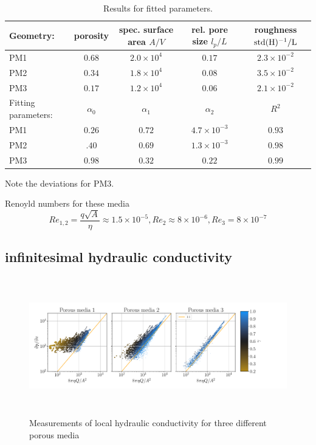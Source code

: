 \documentclass[draft]{agujournal2019}
\begin{document}
\begin{table}[htbp!]
\centering
\begin{tabular}{l|c|c|c|c}
Geometry: & porosity & spec. surface area $A/V$ &rel. pore size $ l_p/L$ & roughness $\rm{std}(H)^{-1}/L$ \\
\hline
PM1 & $0.68$ & $2.0\times10^{4}$ & $0.17$ &  $2.3\times10^{-2}$\\
PM2 & $0.34$ & $1.8\times10^{4}$ & $0.08$ &  $3.5\times10^{-2}$\\
PM3 & $0.17$ & $1.2\times10^{4}$ & $0.06$ &  $2.1\times10^{-2}$\\
\hline
Fitting parameters: & $\alpha_0$ & $\alpha_1$ & $\alpha_2$ & $R^2$  \\
\hline
PM1 & $0.26$ & $0.72$ & $4.7\times 10^{-3}$ &  $0.93$\\
PM2 & $.40$ & $0.69$ & $1.3 \times 10^{-3}$ & $0.98$ \\
PM3 & $0.98$ & $0.32$ & $0.22$ & $0.99$ \\
\end{tabular}
\caption{\label{tab:table-name}Results for fitted parameters.}
\end{table}
Note the deviations for PM3.


Renoyld numbers for these media 
\begin{equation}
	Re_{1,2} = \frac{q \sqrt{A}}{\eta}\approx 1.5 \times 10^{-5}, Re_2 \approx 8 \times 10^{-6}, Re_3 = 8 \times 10^{-7}
\end{equation}

\subsection{infinitesimal hydraulic conductivity}

\begin{figure}\label{fig:local_and_integrated}
\includegraphics[height=6cm]{figures/infi_dpdx_3.pdf}
\caption{Measurements of local hydraulic conductivity for three different porous media}
\end{figure}
\end{document}

